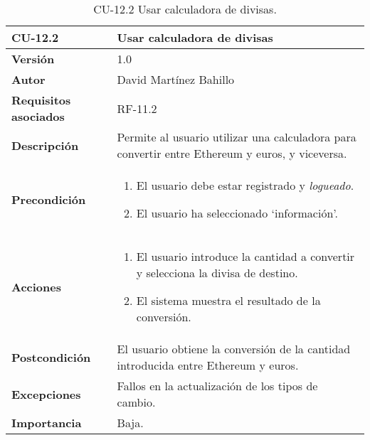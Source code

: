 \begin{table}[p]
	\centering
	\begin{tabularx}{\linewidth}{ p{} p{} }
		\toprule
		\textbf{CU-12.2}  & \textbf{Usar calculadora de divisas}\\
		\midrule
		\textbf{Versión}              & 1.0    \\
		\textbf{Autor}                & David Martínez Bahillo \\
		\textbf{Requisitos asociados} & RF-11.2 \\
		\textbf{Descripción}          & Permite al usuario utilizar una calculadora para convertir entre Ethereum y euros, y viceversa. \\
		\textbf{Precondición}         &  
		\begin{enumerate}
			\item El usuario debe estar registrado y \textit{logueado}.
			\item El usuario ha seleccionado `información'.
		\end{enumerate}\\
		\textbf{Acciones}             &
		\begin{enumerate}
			\item El usuario introduce la cantidad a convertir y selecciona la divisa de destino.
			\item El sistema muestra el resultado de la conversión.
		\end{enumerate}\\
		\textbf{Postcondición}        & El usuario obtiene la conversión de la cantidad introducida entre Ethereum y euros. \\
		\textbf{Excepciones}          & Fallos en la actualización de los tipos de cambio. \\
		\textbf{Importancia}          & Baja. \\
		\bottomrule
	\end{tabularx}
	\caption{CU-12.2 Usar calculadora de divisas.}
\end{table}